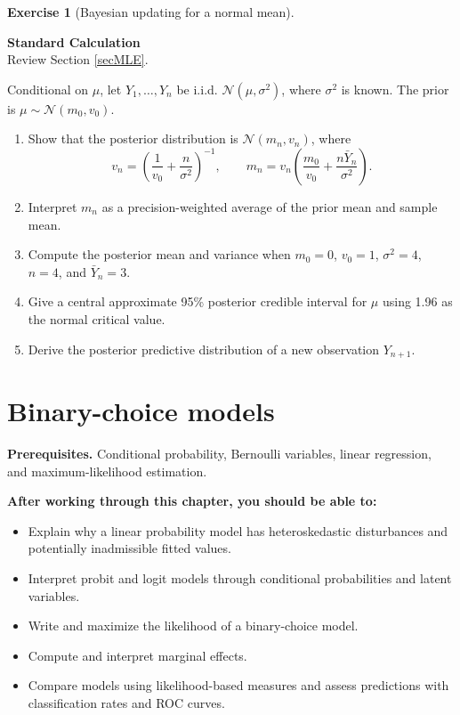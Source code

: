 \documentclass[
  11pt,
]{book}
\providecommand{\tightlist}{%
  \setlength{\itemsep}{0pt}\setlength{\parskip}{0pt}}
\theoremstyle{definition}
\theoremstyle{definition}
\theoremstyle{definition}
\newtheorem{exercise}{Exercise}[chapter]
\theoremstyle{definition}
\theoremstyle{remark}
\begin{document}
\begin{exercisebox}

\begin{exercise}[Bayesian updating for a normal mean]
\protect\hypertarget{exr:estimation-bayesian-normal-mean}{}\label{exr:estimation-bayesian-normal-mean}

\textbf{Standard \textbar{} Calculation}\\
Review Section \ref{secMLE}.

Conditional on \(\mu\), let \(Y_1,\dots,Y_n\) be i.i.d. \(\mathcal{N}(\mu,\sigma^2)\), where \(\sigma^2\) is known. The prior is \(\mu\sim\mathcal{N}(m_0,v_0)\).

\begin{enumerate}
\def\labelenumi{\arabic{enumi}.}
\tightlist
\item
  Show that the posterior distribution is \(\mathcal{N}(m_n,v_n)\), where
  \[
  v_n=\left(\frac1{v_0}+\frac n{\sigma^2}\right)^{-1},
  \qquad
  m_n=v_n\left(\frac{m_0}{v_0}+\frac{n\bar Y_n}{\sigma^2}\right).
  \]
\item
  Interpret \(m_n\) as a precision-weighted average of the prior mean and sample mean.
\item
  Compute the posterior mean and variance when \(m_0=0\), \(v_0=1\), \(\sigma^2=4\), \(n=4\), and \(\bar Y_n=3\).
\item
  Give a central approximate 95\% posterior credible interval for \(\mu\) using 1.96 as the normal critical value.
\item
  Derive the posterior predictive distribution of a new observation \(Y_{n+1}\).
\end{enumerate}

\end{exercise}

\end{exercisebox}

\chapter{Binary-choice models}\label{binary-choice-models}

\textbf{Prerequisites.} Conditional probability, Bernoulli variables, linear regression, and maximum-likelihood estimation.

\textbf{After working through this chapter, you should be able to:}

\begin{itemize}
\tightlist
\item
  Explain why a linear probability model has heteroskedastic disturbances and potentially inadmissible fitted values.
\item
  Interpret probit and logit models through conditional probabilities and latent variables.
\item
  Write and maximize the likelihood of a binary-choice model.
\item
  Compute and interpret marginal effects.
\item
  Compare models using likelihood-based measures and assess predictions with classification rates and ROC curves.
\end{itemize}
\end{document}
